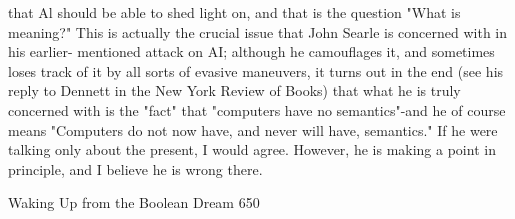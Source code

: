 that Al should be able to shed light on, and that is the question "What is meaning?"
This is actually the crucial issue that John Searle is concerned with in his earlier-
mentioned attack on AI; although he camouflages it, and sometimes loses track of it
by all sorts of evasive maneuvers, it turns out in the end (see his reply to Dennett in
the New York Review of Books) that what he is truly concerned with is the "fact" that
"computers have no semantics"-and he of course means "Computers do not now have,
and never will have, semantics." If he were talking only about the present, I would
agree. However, he is making a point in principle, and I believe he is wrong there.




Waking Up from the Boolean Dream                                                    650

